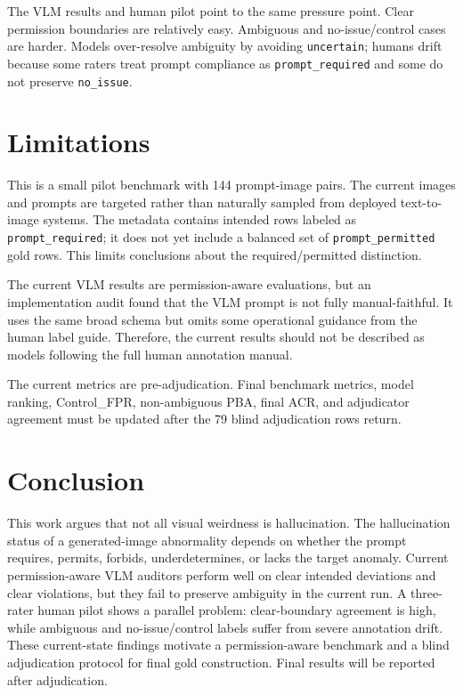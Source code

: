 \documentclass[11pt]{article}
\begin{document}
The VLM results and human pilot point to the same pressure point. Clear permission boundaries are relatively easy. Ambiguous and no-issue/control cases are harder. Models over-resolve ambiguity by avoiding \texttt{uncertain}; humans drift because some raters treat prompt compliance as \texttt{prompt\_required} and some do not preserve \texttt{no\_issue}.

\section{Limitations}

This is a small pilot benchmark with 144 prompt-image pairs. The current images and prompts are targeted rather than naturally sampled from deployed text-to-image systems. The metadata contains intended rows labeled as \texttt{prompt\_required}; it does not yet include a balanced set of \texttt{prompt\_permitted} gold rows. This limits conclusions about the required/permitted distinction.

The current VLM results are permission-aware evaluations, but an implementation audit found that the VLM prompt is not fully manual-faithful. It uses the same broad schema but omits some operational guidance from the human label guide. Therefore, the current results should not be described as models following the full human annotation manual.

The current metrics are pre-adjudication. Final benchmark metrics, model ranking, Control\_FPR, non-ambiguous PBA, final ACR, and adjudicator agreement must be updated after the 79 blind adjudication rows return.

\section{Conclusion}

This work argues that not all visual weirdness is hallucination. The hallucination status of a generated-image abnormality depends on whether the prompt requires, permits, forbids, underdetermines, or lacks the target anomaly. Current permission-aware VLM auditors perform well on clear intended deviations and clear violations, but they fail to preserve ambiguity in the current run. A three-rater human pilot shows a parallel problem: clear-boundary agreement is high, while ambiguous and no-issue/control labels suffer from severe annotation drift. These current-state findings motivate a permission-aware benchmark and a blind adjudication protocol for final gold construction. Final results will be reported after adjudication.
\end{document}
